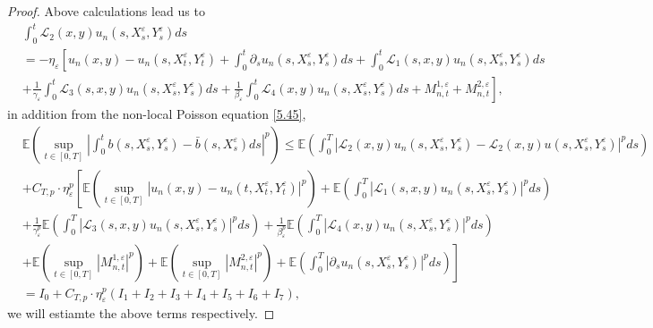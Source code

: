 \documentclass[11pt,reqno]{amsart}
\numberwithin{equation}{section}
\begin{document}
\begin{proof}
Above calculations lead us to 
\begin{equation}\label{5.47}
	\begin{split}
		&\int_{0}^{t}\mathcal{L}_{2}(x,y)u_{n}(s,X_{s}^{\varepsilon},Y_{s}^{\varepsilon})ds\\
	&=-\eta_{\varepsilon}\left[ u_{n}(x,y)-u_{n}(s,X_{t}^{\varepsilon},Y_{t}^{\varepsilon})+\int_{0}^{t}\partial_{s}u_{n}(s,X_{s}^{\varepsilon},Y_{s}^{\varepsilon})ds
	+\int_{0}^{t}\mathcal{L}_{1}(s,x,y)u_{n}(s,X_{s}^{\varepsilon},Y_{s}^{\varepsilon})ds\right.	\\
	&\left. +\frac{1}{\gamma_{\varepsilon}}\int_{0}^{t}\mathcal{L}_{3}(s,x,y)u_{n}(s,X_{s}^{\varepsilon},Y_{s}^{\varepsilon})ds+\frac{1}{\beta_{\varepsilon}}\int_{0}^{t}\mathcal{L}_{4}(x,y)u_{n}(s,X_{s}^{\varepsilon},Y_{s}^{\varepsilon})ds +M_{n,t}^{1,\varepsilon}+M_{n,t}^{2,\varepsilon}\right],
	\end{split}
\end{equation}
in addition from the non-local Poisson equation \eqref{5.45},
\begin{align}
&\mathbb{E}\left( \sup_{t\in [0,T]}\left| \int_{0}^{t} b(s,X_{s}^{\varepsilon},Y_{s}^{\varepsilon})-\bar{b}(s,X_{s}^{\varepsilon})ds\right| ^{p}\right)\leq  \mathbb{E}\left(  \int_{0}^{T}\left|\mathcal{L}_{2}(x,y)u_{n}(s,X_{s}^{\varepsilon},Y_{s}^{\varepsilon})-\mathcal{L}_{2}(x,y)u(s,X_{s}^{\varepsilon},Y_{s}^{\varepsilon})\right|^{p}ds \right)\nonumber\\
&+ C_{T,p}\cdot \eta_{\varepsilon}^{p}\left[ \mathbb{E}\left( \sup_{t\in [0,T]}|u_{n}(x,y)-u_{n}(t,X_{t}^{\varepsilon},Y_{t}^{\varepsilon})|^{p}\right) +\mathbb{E}\left( \int_{0}^{T}|\mathcal{L}_{1}(s,x,y)u_{n}(s,X_{s}^{\varepsilon},Y_{s}^{\varepsilon})|^{p}ds\right)\right.	\nonumber\\
&\left.+\frac{1}{\gamma_{\varepsilon}^{p}}\mathbb{E}\left( \int_{0}^{T}|\mathcal{L}_{3}(s,x,y)u_{n}(s,X_{s}^{\varepsilon},Y_{s}^{\varepsilon})|^{p}ds\right)+\frac{1}{\beta_{\varepsilon}^{p}}\mathbb{E}\left( \int_{0}^{T}|\mathcal{L}_{4}(x,y)u_{n}(s,X_{s}^{\varepsilon},Y_{s}^{\varepsilon})|^{p}ds\right)\right.\nonumber	\\
&\left.+\mathbb{E}\left( \sup_{t\in [0,T]}|M_{n,t}^{1,\varepsilon}|^{p}\right)+\mathbb{E}\left( \sup_{t\in [0,T]}|M_{n,t}^{2,\varepsilon}|^{p}\right) + \mathbb{E}\left(  \int_{0}^{T}\left|\partial_{s}u_{n}(s,X_{s}^{\varepsilon},Y_{s}^{\varepsilon})\right|^{p}ds \right)\right] \nonumber\\
&=I_{0}+C_{T,p}\cdot \eta_{\varepsilon}^{p}\left( I_{1}+I_{2}+I_{3}+I_{4}+I_{5}+I_{6}+I_{7}\right),\label{5.48}
\end{align}
we will estiamte the above terms respectively. 


\end{proof}
\end{document}
